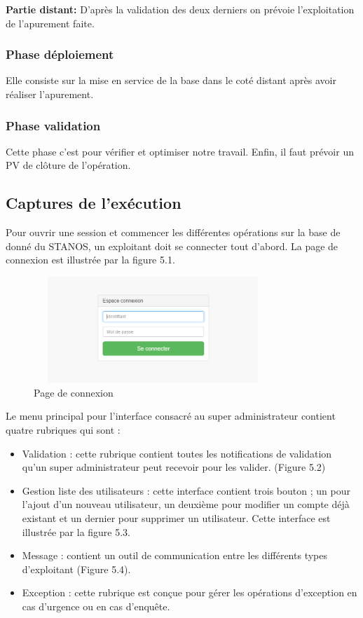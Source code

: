\textbf{Partie distant:} D'après la validation des deux derniers on prévoie l'exploitation de l'apurement faite.\\

\subsubsection{Phase déploiement}
Elle consiste sur la mise en service de la base dans le coté distant après avoir réaliser l'apurement.\\

\subsubsection{Phase validation}
Cette phase c'est pour vérifier et optimiser notre travail. Enfin, il faut prévoir un PV de clôture de l'opération.
\subsection{Captures de l'exécution}

Pour ouvrir une session et commencer les différentes opérations sur la base de donné du STANOS, un exploitant doit se connecter tout d’abord. La page de connexion est illustrée par la figure 5.1.\\


\begin{figure}[!h]
\begin{center}
\includegraphics[width=9cm,height=4cm]{resultats/connexion.png}
\end{center}
\caption{Page de connexion}
\end{figure}
Le menu principal pour l’interface consacré au super administrateur contient quatre rubriques qui sont :
\begin{itemize}
\item Validation : cette rubrique contient toutes les notifications de validation qu’un super administrateur peut recevoir pour les valider. (Figure 5.2)\\
\item Gestion liste des utilisateurs : cette interface contient trois bouton ; un pour l’ajout d’un nouveau utilisateur, un deuxième pour modifier un compte déjà existant et un dernier pour supprimer un utilisateur. Cette interface est illustrée par la figure 5.3.\\
\item Message : contient un outil de communication entre les différents types d’exploitant (Figure 5.4).\\
\item Exception : cette rubrique est conçue pour gérer les opérations d’exception en cas d’urgence ou en cas d’enquête.\\
\end{itemize}

